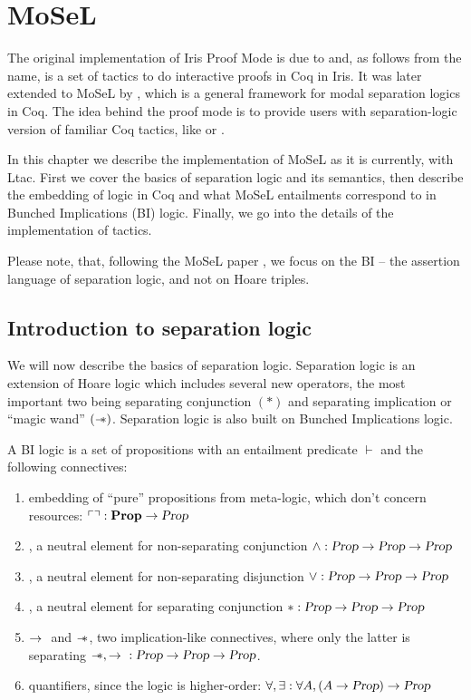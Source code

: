 \chapter{MoSeL}
\label{chap:reimplementation_ipm}

The original implementation of Iris Proof Mode is due to \citet{krebbersInteractiveProofsHigherorder2017} and, as follows from the name, is a set of tactics to do interactive proofs in Coq in Iris.
It was later extended to MoSeL by \citet{krebbersMoSeLGeneralExtensible2018}, which is a general framework for modal separation logics in Coq.
The idea behind the proof mode is to provide users with separation-logic version of familiar Coq tactics, like  or .

In this chapter we describe the implementation of MoSeL as it is currently, with Ltac.
First we cover the basics of separation logic and its semantics, then describe the embedding of logic in Coq and what MoSeL entailments correspond to in Bunched Implications (BI) logic.
Finally, we go into the details of the implementation of tactics.

Please note, that, following the MoSeL paper \cite[Section 2]{krebbersMoSeLGeneralExtensible2018}, we focus on the BI -- the assertion language of separation logic, and not on Hoare triples.

\section{Introduction to separation logic}
\label{sec:separation-logic-intro}

We will now describe the basics of separation logic.
Separation logic is an extension of Hoare logic which includes several new operators, the most important two being separating conjunction \((*)\) and separating implication or ``magic wand'' \((\mathrel{-\mkern-6mu*})\).
Separation logic is also built on Bunched Implications logic.

A BI logic is a set of propositions \Prop with an entailment predicate \(\vdash\) and the following connectives:
\begin{enumerate}
\item embedding of ``pure'' propositions from meta-logic, which don't concern resources: \(\ulcorner   \urcorner : \textbf{Prop} \to \textsl{Prop}\)
\item \True, a neutral element for non-separating conjunction \(\wedge : \textsl{Prop} \to \textsl{Prop} \to \textsl{Prop}\)
\item \False, a neutral element for non-separating disjunction \(\vee : \textsl{Prop} \to \textsl{Prop} \to \textsl{Prop}\)
\item \emp, a neutral element for separating conjunction \(* : \textsl{Prop} \to \textsl{Prop} \to \textsl{Prop}\)
\item \(\mathbin{\rightarrow}~\) and \(\mathrel{-\mkern-6mu*}\), two implication-like connectives, where only the latter is separating \(\mathrel{-\mkern-6mu*}, \mathbin{\rightarrow}~ : \textsl{Prop} \to \textsl{Prop} \to \textsl{Prop}\).
\item quantifiers, since the logic is higher-order: \(\forall, \exists : \forall A, (A \to \textsl{Prop}) \to \textsl{Prop}\)
\end{enumerate}

